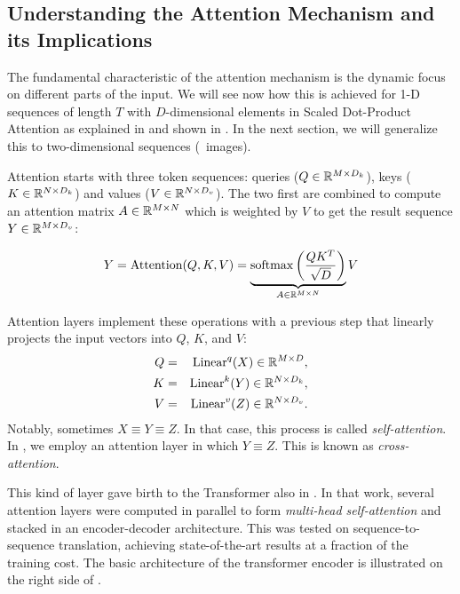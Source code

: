 \subsection{Understanding the Attention Mechanism and its Implications}
The fundamental characteristic of the attention mechanism is the dynamic focus on different parts of the input. We will see now how this is achieved for 1-D sequences of length $T$ with $D$-dimensional elements in Scaled Dot-Product Attention as explained in  and shown in . In the next section, we will generalize this to two-dimensional sequences (\ie~images).

Attention starts with three token sequences: queries ($Q\in \mathbb{R}^{M\times D_k}$), keys ($K\in \mathbb{R}^{N\times D_k}$) and values ($V\in \mathbb{R}^{N\times D_v}$). The two first are combined to compute an attention matrix $A\in \mathbb{R}^{M\times N}$ which is weighted by $V$ to get the result sequence $Y\in \mathbb{R}^{M\times D_v}$:

\begin{equation}
    Y = \text{Attention}(Q, K, V) = \underbrace{\operatorname{softmax}\left(\dfrac{QK^T}{\sqrt{D}}\right)}_{A \in \mathbb{R}^{M\times N}}V
\end{equation}


Attention layers implement these operations with a previous step that linearly projects the input vectors into $Q$, $K$, and $V$:
\begin{eqnarray*}
    Q & = & \operatorname{Linear}^q(X) \in \mathbb{R}^{M\times D}, \\
    K & = & \operatorname{Linear}^k(Y) \in \mathbb{R}^{N\times D_k}, \\
    V & = & \operatorname{Linear}^v(Z) \in \mathbb{R}^{N\times D_v}.
\end{eqnarray*}
Notably, sometimes $X\equiv Y\equiv Z$. In that case, this process is called \textit{self-attention}. In , we employ an attention layer in which $Y\equiv Z$. This is known as \textit{cross-attention}.

This kind of layer gave birth to the Transformer also in . In that work, several attention layers were computed in parallel to form \textit{multi-head self-attention} and stacked in an encoder-decoder architecture. This was tested on sequence-to-sequence translation, achieving state-of-the-art results at a fraction of the training cost. The basic architecture of the transformer encoder is illustrated on the right side of .

